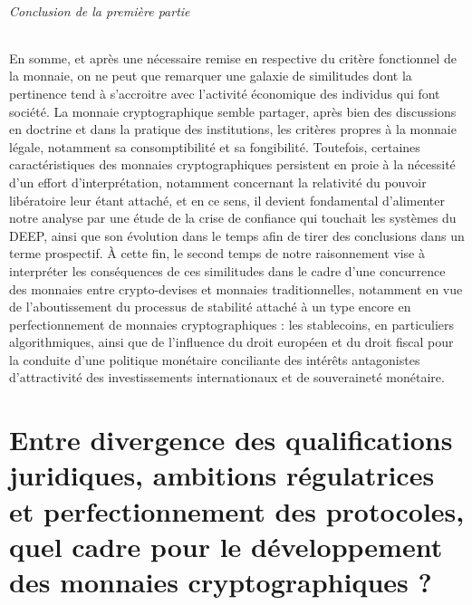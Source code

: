 {\subparagraph{Conclusion de la première partie}
En somme, et après une nécessaire remise en respective du critère fonctionnel de la monnaie, on ne peut que remarquer une galaxie de similitudes dont la pertinence tend à s'accroitre avec l'activité économique des individus qui font société. La monnaie cryptographique semble partager, après bien des discussions en doctrine et dans la pratique des institutions, les critères propres à la monnaie légale, notamment sa consomptibilité et sa fongibilité. Toutefois, certaines caractéristiques des monnaies cryptographiques persistent en proie à la nécessité d'un effort d'interprétation, notamment concernant la relativité du pouvoir libératoire leur étant attaché, et en ce sens, il devient fondamental d'alimenter notre analyse par une étude de la crise de confiance qui touchait les systèmes du DEEP, ainsi que son évolution dans le temps afin de tirer des conclusions dans un terme prospectif. À cette fin, le second temps de notre raisonnement vise à interpréter les conséquences de ces similitudes dans le cadre d'une concurrence des monnaies entre crypto-devises et monnaies traditionnelles, notamment en vue de l'aboutissement du processus de stabilité attaché à un type encore en perfectionnement de monnaies cryptographiques : les stablecoins, en particuliers algorithmiques, ainsi que de l'influence du droit européen et du droit fiscal pour la conduite d'une politique monétaire conciliante des intérêts antagonistes d'attractivité des investissements internationaux et de souveraineté monétaire.
	
\chapter{Entre divergence des qualifications juridiques, ambitions régulatrices et perfectionnement des protocoles, quel cadre pour le développement des monnaies cryptographiques ?}

}

